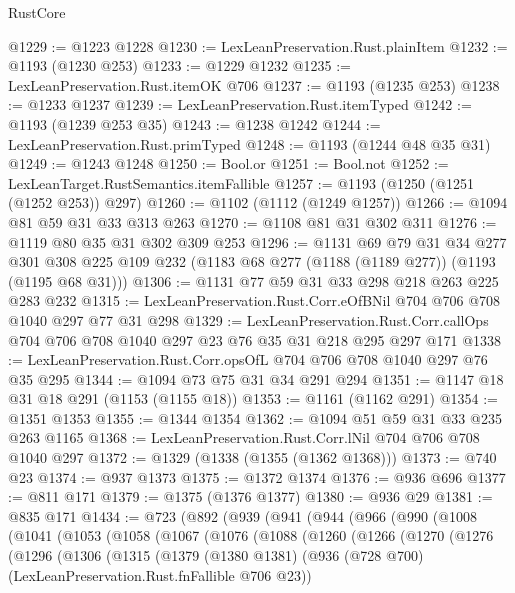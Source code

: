 \begin{lexlean}{RustCore}
\begin{coremodule}
@1229 := @1223 @1228
@1230 := LexLeanPreservation.Rust.plainItem
@1232 := @1193 (@1230 @253)
@1233 := @1229 @1232
@1235 := LexLeanPreservation.Rust.itemOK @706
@1237 := @1193 (@1235 @253)
@1238 := @1233 @1237
@1239 := LexLeanPreservation.Rust.itemTyped
@1242 := @1193 (@1239 @253 @35)
@1243 := @1238 @1242
@1244 := LexLeanPreservation.Rust.primTyped
@1248 := @1193 (@1244 @48 @35 @31)
@1249 := @1243 @1248
@1250 := Bool.or
@1251 := Bool.not
@1252 := LexLeanTarget.RustSemantics.itemFallible
@1257 := @1193 (@1250 (@1251 (@1252 @253)) @297)
@1260 := @1102 (@1112 (@1249 @1257))
@1266 := @1094 @81 @59 @31 @33 @313 @263
@1270 := @1108 @81 @31 @302 @311
@1276 := @1119 @80 @35 @31 @302 @309 @253
@1296 := @1131
    @69
    @79
    @31
    @34
    @277
    @301
    @308
    @225
    @109
    @232
    (@1183 @68 @277 (@1188 (@1189 @277)) (@1193 (@1195 @68 @31)))
@1306 := @1131 @77 @59 @31 @33 @298 @218 @263 @225 @283 @232
@1315 := LexLeanPreservation.Rust.Corr.eOfBNil @704 @706 @708 @1040 @297 @77 @31 @298
@1329 := LexLeanPreservation.Rust.Corr.callOps
    @704
    @706
    @708
    @1040
    @297
    @23
    @76
    @35
    @31
    @218
    @295
    @297
    @171
@1338 := LexLeanPreservation.Rust.Corr.opsOfL @704 @706 @708 @1040 @297 @76 @35 @295
@1344 := @1094 @73 @75 @31 @34 @291 @294
@1351 := @1147 @18 @31 @18 @291 (@1153 (@1155 @18))
@1353 := @1161 (@1162 @291)
@1354 := @1351 @1353
@1355 := @1344 @1354
@1362 := @1094 @51 @59 @31 @33 @235 @263 @1165
@1368 := LexLeanPreservation.Rust.Corr.lNil @704 @706 @708 @1040 @297
@1372 := @1329 (@1338 (@1355 (@1362 @1368)))
@1373 := @740 @23
@1374 := @937 @1373
@1375 := @1372 @1374
@1376 := @936 @696
@1377 := @811 @171
@1379 := @1375 (@1376 @1377)
@1380 := @936 @29
@1381 := @835 @171
@1434 := @723
    (@892
      (@939
        (@941
          (@944
            (@966
              (@990
                (@1008
                  (@1041
                    (@1053
                      (@1058
                        (@1067
                          (@1076
                            (@1088
                              (@1260
                                (@1266
                                  (@1270
                                    (@1276
                                      (@1296
                                        (@1306
                                          (@1315
                                            (@1379
                                              (@1380 @1381)
                                              (@936
                                                (@728 @700)
                                                (LexLeanPreservation.Rust.fnFallible @706 @23))

\end{coremodule}
\end{lexlean}
